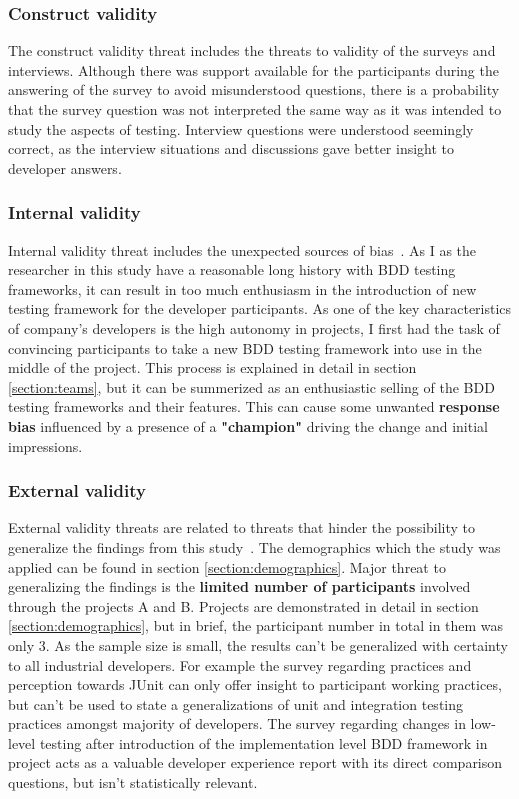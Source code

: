 \subsubsection{Construct validity}
The construct validity threat includes the threats to validity of the surveys and interviews. Although there was support available
for the participants during the answering of the survey to avoid misunderstood questions, there is a probability
that the survey question was not interpreted the same way as it was intended to study the aspects of testing. Interview questions
were understood seemingly correct, as the interview situations and discussions gave better insight to developer answers.
\subsubsection{Internal validity}
Internal validity threat includes the unexpected sources of bias~\cite{kitchenham2002preliminary}. As I as the researcher
in this study have a reasonable long history with BDD testing frameworks, it can result in too much enthusiasm in the introduction
of new testing framework for the developer participants. As one of the key characteristics of company's developers is the
high autonomy in projects, I first had the task of convincing participants to take a new BDD testing framework into use in the middle of the
project. This process is explained in detail in section \ref{section:teams}, but it can be summerized as an enthusiastic selling of the
BDD testing frameworks and their features. This can cause some unwanted \textbf{response bias} influenced by a presence of a \textbf{"champion"}
driving the change and initial impressions.
\subsubsection{External validity}
External validity threats are related to threats that hinder the possibility to generalize the findings from this study~\cite{runeson2012case}.
The demographics which the study was applied can be found in section \ref{section:demographics}. Major threat to generalizing the findings
is the \textbf{limited number of participants} involved through the projects A and B. Projects are demonstrated in detail in section \ref{section:demographics},
but in brief, the participant number in total in them was only 3. As the sample size is small, the results can't be generalized
with certainty to all industrial developers. For example the survey regarding practices and perception towards JUnit can
only offer insight to participant working practices, but can't be used to state a generalizations of unit and integration
testing practices amongst majority of developers.
The survey regarding changes in low-level testing after introduction of the implementation level BDD framework in project acts
as a valuable developer experience report with its direct comparison questions, but isn't statistically relevant.


